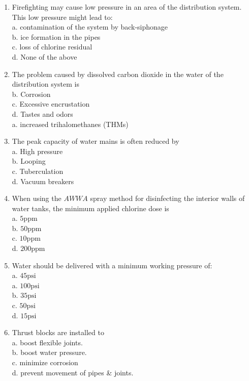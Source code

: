 \begin{enumerate}[1.]
\item Firefighting may cause low pressure in an area of the distribution system. This low pressure might lead to:\\
a. contamination of the system by back-siphonage\\
b. ice formation in the pipes\\
c. loss of chlorine residual\\
d. None of the above\\

\item The problem caused by dissolved carbon dioxide in the water of the distribution system is\\
b.  Corrosion\\
c. Excessive encrustation\\
d. Tastes and odors\\
a. increased trihalomethanes (THMs)\\

\item The peak capacity of water mains is often reduced by\\
a. High pressure\\
b. Looping\\
c. Tuberculation\\
d. Vacuum breakers\\

\item When using the $A W W A$ spray method for disinfecting the interior walls of water tanks, the minimum applied chlorine dose is\\
a. $5 \mathrm{ppm}$\\
b. $50 \mathrm{ppm}$\\
c. $10 \mathrm{ppm}$\\
d. $200 \mathrm{ppm}$\\

\item Water should be delivered with a minimum working pressure of:\\
a. $45 \mathrm{psi}$\\
a. $100 \mathrm{psi}$\\
b. $35 \mathrm{psi}$\\
c. $50 \mathrm{psi}$\\
d. $15 \mathrm{psi}$\\

\item Thrust blocks are installed to\\
a. boost flexible joints.\\
b. boost water pressure.\\
c. minimize corrosion\\
d. prevent movement of pipes \& joints.\\


\end{enumerate}
